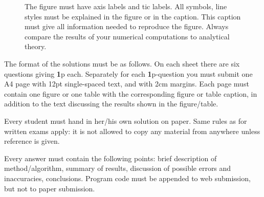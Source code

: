 \documentclass[12pt,A4]{article}
\begin{document}
\parindent=0cm

\begin{figure}
\caption{\label{fig:1} The figure must have axis labels and tic labels. 
 All symbols, line styles must be explained in the figure or in the caption. This caption must give all information needed to reproduce the figure. Always compare the results of your numerical computations to analytical theory. }
\end{figure}


The format of the solutions must be as follows. On each  sheet there are six questions giving {\bf 1}p each. Separately for each {\bf 1}p-question you must submit one A4 page with 12pt single-spaced text, and with 2cm margins. Each page must  contain  one figure or one table with the corresponding figure or table caption, in addition to the text discussing the results shown in the figure/table.

Every student must hand in her/his own solution on paper. Same rules as for written exams apply: it is not allowed to copy any material from anywhere unless reference is given.

Every answer must contain the following points: brief description of method/algorithm, summary of results, discussion of possible errors and inaccuracies, conclusions. Program code must be appended to web submission, but not to paper submission.
\end{document}
